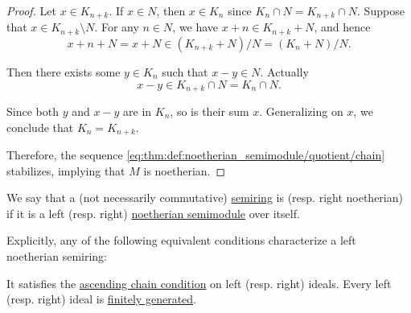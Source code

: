 \begin{proof}
  Let \( x \in K_{n + k} \). If \( x \in N \), then \( x \in K_n \) since \( K_n \cap N = K_{n + k} \cap N \). Suppose that \( x \in K_{n + k} \setminus N \). For any \( n \in N \), we have \( x + n \in K_{n + k} + N \), and hence
  \begin{equation*}
    x + n + N = x + N \in (K_{n + k} + N) / N = (K_n + N) / N.
  \end{equation*}

  Then there exists some \( y \in K_n \) such that \( x - y \in N \). Actually
  \begin{equation*}
    x - y \in K_{n + k} \cap N = K_n \cap N.
  \end{equation*}

  Since both \( y \) and \( x - y \) are in \( K_n \), so is their sum \( x \). Generalizing on \( x \), we conclude that \( K_n = K_{n + k} \).

  Therefore, the sequence \eqref{eq:thm:def:noetherian_semimodule/quotient/chain} stabilizes, implying that \( M \) is noetherian.
\end{proof}

\begin{definition}\label{def:noetherian_semiring}
  We say that a (not necessarily commutative) \hyperref[def:semiring]{semiring} is  (resp. right noetherian) if it is a left (resp. right) \hyperref[def:noetherian_semimodule]{noetherian semimodule} over itself.

  Explicitly, any of the following equivalent conditions characterize a left noetherian semiring:
  \begin{thmenum}
     It satisfies the \hyperref[def:chain_condition]{ascending chain condition} on left (resp. right) ideals.
     Every left (resp. right) ideal is \hyperref[def:semiring_ideal/generated]{finitely generated}.
  \end{thmenum}
\end{definition}

